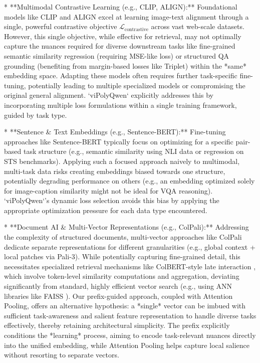 *   **Multimodal Contrastive Learning (e.g., CLIP, ALIGN):** Foundational models like CLIP \cite{radford2021learning} and ALIGN \cite{jia2021scaling} excel at learning image-text alignment through a single, powerful contrastive objective $\mathcal{L}_{\text{contrastive}}$ across vast web-scale datasets. However, this single objective, while effective for retrieval, may not optimally capture the nuances required for diverse downstream tasks like fine-grained semantic similarity regression (requiring MSE-like loss) or structured QA grounding (benefiting from margin-based losses like Triplet) within the *same* embedding space. Adapting these models often requires further task-specific fine-tuning, potentially leading to multiple specialized models or compromising the original general alignment. `viPolyQwen` explicitly addresses this by incorporating multiple loss formulations within a single training framework, guided by task type.

*   **Sentence & Text Embeddings (e.g., Sentence-BERT):** Fine-tuning approaches like Sentence-BERT \cite{reimers2019sentence} typically focus on optimizing for a specific pair-based task structure (e.g., semantic similarity using NLI data or regression on STS benchmarks). Applying such a focused approach naively to multimodal, multi-task data risks creating embeddings biased towards one structure, potentially degrading performance on others (e.g., an embedding optimized solely for image-caption similarity might not be ideal for VQA reasoning). `viPolyQwen`'s dynamic loss selection avoids this bias by applying the appropriate optimization pressure for each data type encountered.

*   **Document AI & Multi-Vector Representations (e.g., ColPali):** Addressing the complexity of structured documents, multi-vector approaches like ColPali \cite{faysse2024colpali} dedicate separate representations for different granularities (e.g., global context + local patches via Pali-3). While potentially capturing fine-grained detail, this necessitates specialized retrieval mechanisms like ColBERT-style late interaction \cite{khattab2020colbert}, which involve token-level similarity computations and aggregation, deviating significantly from standard, highly efficient vector search (e.g., using ANN libraries like FAISS \cite{johnson2019billion}). Our prefix-guided approach, coupled with Attention Pooling, offers an alternative hypothesis: a *single* vector can be imbued with sufficient task-awareness and salient feature representation to handle diverse tasks effectively, thereby retaining architectural simplicity. The prefix explicitly conditions the *learning* process, aiming to encode task-relevant nuances directly into the unified embedding, while Attention Pooling helps capture local salience without resorting to separate vectors.

